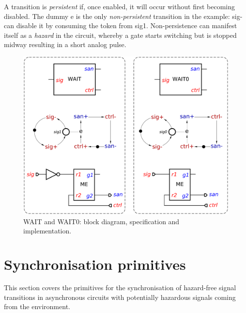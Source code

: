 \documentclass[conference]{IEEEtran}
\begin{document}
A transition is \emph{persistent} if, once enabled, it will occur without first becoming
disabled. The dummy \textsf{e} is the only \emph{non-persistent} transition in the
example: \textsf{sig-} can disable it by consuming the token from \textsf{sig1}. Non-persistence
can manifest itself as a \emph{hazard} in the circuit, whereby a gate starts
switching but is stopped midway resulting in a short analog pulse.


\begin{figure}
\begin{center}
    \includegraphics[scale=0.23]{fig/WAIT.pdf}
    \vspace{-6mm}
    \caption{\textsf{WAIT} and \textsf{WAIT0}: block diagram,
    specification and implementation.}
    \label{fig:wait}
    \vspace{-6mm}
\end{center}
\end{figure}

\section{Synchronisation primitives}\label{sec-sync}

This section covers the primitives for the synchronisation of hazard-free signal
transitions in asynchronous circuits with potentially hazardous signals coming
from the environment.
\end{document}
